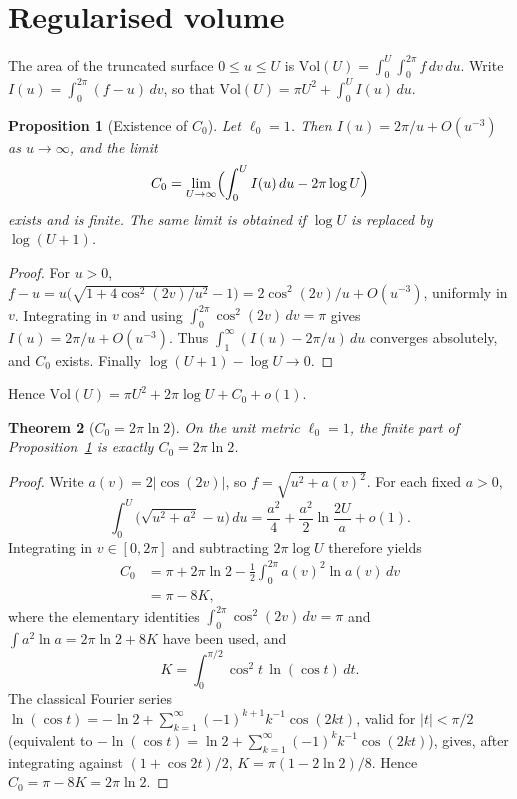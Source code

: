 \documentclass[11pt,a4paper]{article}
\newtheorem{theorem}{Theorem}
\newtheorem{proposition}[theorem]{Proposition}
\theoremstyle{definition}
\theoremstyle{remark}
\begin{document}
\section{Regularised volume}

The area of the truncated surface $0\le u\le U$ is
$\mathrm{Vol}(U)=\int_0^U\int_0^{2\pi} f\,dv\,du$.
Write $I(u)=\int_0^{2\pi}(f-u)\,dv$, so that
$\mathrm{Vol}(U)=\pi U^2+\int_0^U I(u)\,du$.

\begin{proposition}[Existence of $C_0$]
\label{prop:c0exists}
Let $\ell_0=1$. Then $I(u)=2\pi/u+O(u^{-3})$ as $u\to\infty$, and the
limit
\begin{equation}
  C_0=\lim_{U\to\infty}\Bigl(\int_0^U I(u)\,du-2\pi\log U\Bigr)
\end{equation}
exists and is finite. The same limit is obtained if $\log U$ is replaced
by $\log(U+1)$.
\end{proposition}

\begin{proof}
For $u>0$,
$f-u=u\bigl(\sqrt{1+4\cos^2(2v)/u^2}-1\bigr)
=2\cos^2(2v)/u+O(u^{-3})$,
uniformly in $v$. Integrating in $v$ and using
$\int_0^{2\pi}\cos^2(2v)\,dv=\pi$ gives $I(u)=2\pi/u+O(u^{-3})$.
Thus $\int_1^\infty(I(u)-2\pi/u)\,du$ converges absolutely, and $C_0$
exists. Finally $\log(U+1)-\log U\to 0$.
\end{proof}

Hence
$\mathrm{Vol}(U)=\pi U^2+2\pi\log U+C_0+o(1)$.

\begin{theorem}[$C_0=2\pi\ln 2$]
\label{thm:c0}
On the unit metric $\ell_0=1$, the finite part of Proposition~\ref{prop:c0exists}
is exactly $C_0=2\pi\ln 2$.
\end{theorem}

\begin{proof}
Write $a(v)=2\lvert\cos(2v)\rvert$, so $f=\sqrt{u^2+a(v)^2}$. For each fixed
$a>0$,
\[
  \int_0^U\bigl(\sqrt{u^2+a^2}-u\bigr)\,du
  =\frac{a^2}{4}+\frac{a^2}{2}\ln\frac{2U}{a}+o(1).
\]
Integrating in $v\in[0,2\pi]$ and subtracting $2\pi\log U$ therefore yields
\begin{align*}
  C_0
  &=\pi+2\pi\ln 2-\frac12\int_0^{2\pi}a(v)^2\ln a(v)\,dv\\
  &=\pi-8K,
\end{align*}
where the elementary identities $\int_0^{2\pi}\cos^2(2v)\,dv=\pi$ and
$\int a^2\ln a=2\pi\ln 2+8K$ have been used, and
\[
  K=\int_0^{\pi/2}\cos^2 t\,\ln(\cos t)\,dt.
\]
The classical Fourier series
$\ln(\cos t)=-\ln 2+\sum_{k=1}^\infty(-1)^{k+1}k^{-1}\cos(2kt)$,
valid for $\lvert t\rvert<\pi/2$
(equivalent to $-\ln(\cos t)=\ln 2+\sum_{k=1}^\infty(-1)^k k^{-1}\cos(2kt)$),
gives, after integrating against $(1+\cos 2t)/2$,
$K=\pi(1-2\ln 2)/8$. Hence $C_0=\pi-8K=2\pi\ln 2$.
\end{proof}
\end{document}
